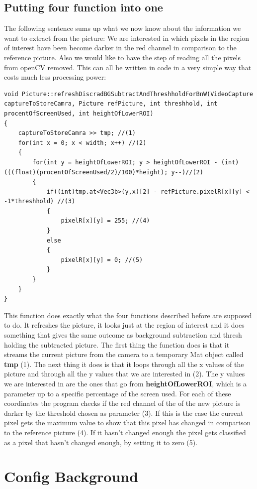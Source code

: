 \subsection{Putting four function into one}
The following sentence sums up what we now  know about the information we want to extract from the picture: We are interested in which pixels in the region of interest have been become darker in the red channel in comparison to the reference picture. Also we would like to have the step of reading all the pixels from openCV removed. This can all be written in code in a very simple way that costs much less processing power:

\begin{lstlisting}
void Picture::refreshDiscradBGSubtractAndThreshholdForBnW(VideoCapture captureToStoreCamra, Picture refPicture, int threshhold, int procentOfScreenUsed, int heightOfLowerROI)
{
	captureToStoreCamra >> tmp; //(1)
	for(int x = 0; x < width; x++) //(2)
	{
		for(int y = heightOfLowerROI; y > heightOfLowerROI - (int)(((float)(procentOfScreenUsed/2)/100)*height); y--)//(2)
		{
			if((int)tmp.at<Vec3b>(y,x)[2] - refPicture.pixelR[x][y] < -1*threshhold) //(3)
			{
				pixelR[x][y] = 255; //(4)
			}
			else
			{
				pixelR[x][y] = 0; //(5)
			}
		}
	}
}
\end{lstlisting}
This function does exactly what the four functions described before are supposed to do. It refreshes the picture, it looks just at the region of interest and it does something that gives the same outcome as background subtraction and thresh holding the subtracted picture.
The first thing the function does is that it streams the current picture from the camera to a temporary Mat object called \textbf{tmp} (1). The next thing it does is that it loops through all the x values of the picture and through all the y values that we are interested in (2). The y values we are interested in are the ones that go from \textbf{heightOfLowerROI}, which is a parameter up to a specific percentage of the screen used. For each of these coordinates the program checks if the red channel of the of the new picture is darker by the threshold chosen as parameter (3). If this is the case the current pixel gets the maximum value to show that this pixel has changed in comparison to the reference picture (4). If it hasn't changed enough the pixel gets classified as a pixel that hasn't changed enough, by setting it to zero (5).

\section{Config Background}

